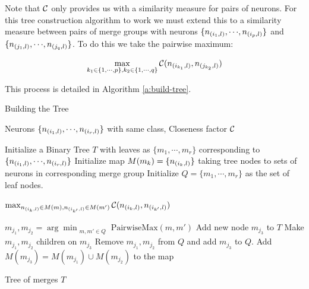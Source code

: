 Note that $\mathcal{C}$ only provides us
with a similarity measure for pairs of neurons. For this tree construction
algorithm to work we must extend this to a similarity
measure between pairs of merge groups with neurons
$\{n_{(i_1,l)}, {\cdots}, n_{(i_p,l)}\}$ and $\{n_{(j_1,l)}, {\cdots},
n_{(j_q,l)}\}$. To do this we take the pairwise maximum: 

\begin{equation*}
\begin{aligned}
    \max_{k_1 \in \{1, {\cdots}, p\},
    k_2 \in \{1, {\cdots}, q\}} \mathcal{C}( n_{(i_{k_1},l)}, n_{(j_{k_2},l)} )
\end{aligned}
\end{equation*}


This process is detailed in Algorithm \ref{a:build-tree}.

\begin{algorithm}[H]
\caption{Building the Tree}
\label{a:build-tree}
\begin{algorithmic}[1]

    \Require Neurons $\{n_{(i_1,l)}, {\cdots}, n_{(i_r,l)}\}$ with same class,
    Closeness factor $\mathcal{C}$

    
    \State Initialize a Binary Tree $T$ with leaves as
        $\{m_1, {\cdots}, m_r\}$ corresponding to $\{ n_{(i_1,l)}, {\cdots},
        n_{(i_r,l)} \}$
    \State Initialize map $M(m_k) = \{ n_{(i_k,l)} \}$ taking tree nodes to sets
        of neurons in corresponding merge group
    \State Initialize $Q=\{m_1, {\cdots}, m_r\}$ as the set of leaf nodes.

        
            \Return $\max_{n_{(i_{k},l)} \in M(m), n_{(i_{k'},l)} \in M(m')} 
                \mathcal{C}( n_{(i_{k},l)}, n_{(i_{k'},l)} )$

    \EndFunction

        \State $m_{j_1}, m_{j_2} = \arg\min_{\substack{m, m' \in Q}} 
            \text{PairwiseMax}(m, m')$
        \State Add new node $m_{j_3}$ to $T$ 
        \State Make $m_{j_1}, m_{j_2}$ children on $m_{j_3}$
        \State Remove $m_{j_1}, m_{j_2}$ from $Q$ and add $m_{j_3}$ to $Q$.
        \State Add $M(m_{j_3}) = M(m_{j_1}) \cup M(m_{j_2})$ to the map
    \EndWhile

    \Ensure Tree of merges $T$
\end{algorithmic}
\end{algorithm}


